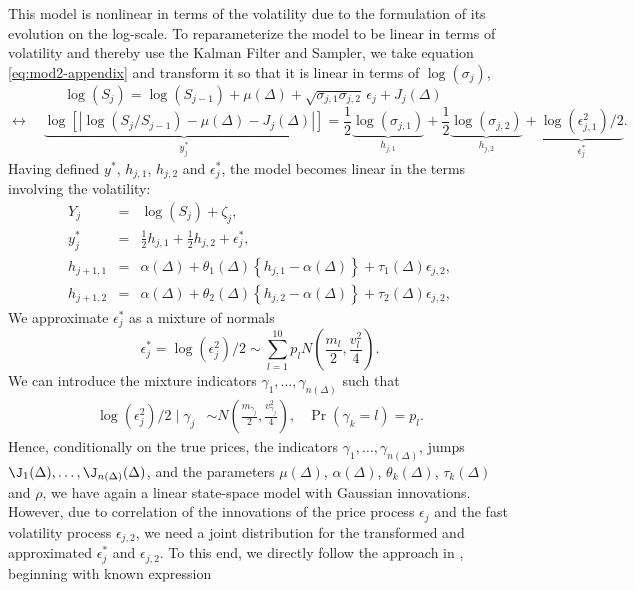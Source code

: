 \documentclass[10pt]{article}
\begin{document}
This model is nonlinear in terms of the volatility due to the formulation of its evolution on the log-scale. To reparameterize the model to be linear in terms of volatility and thereby use the Kalman Filter and Sampler, we take equation \eqref{eq:mod2-appendix} and transform it so that it is linear in terms of $\log(\sigma_j)$,
\[
  \log(S_{j}) = \log(S_{j-1}) + \mu(\Delta) + \sqrt{\sigma_{j,1}\sigma_{j,2}} \, \epsilon_{j} + J_j(\Delta) \quad \]
\[ \leftrightarrow \quad \underbrace{ \log\left[ \left| \log(S_{j}/S_{j-1}) - \mu(\Delta) - J_j(\Delta) \right| \right] }_{y_j^*} = \frac{1}{2}\underbrace{  \log(\sigma_{j,1}) }_{h_{j,1}} + \frac{1}{2}\underbrace{  \log(\sigma_{j,2}) }_{h_{j,2}} + \underbrace{ \log(  \epsilon_{j,1}^2  )/2 }_{\epsilon_{j}^{*}}.
\]
Having defined $y^*$, $h_{j,1}$, $h_{j,2}$ and $\epsilon_{j}^*$, the model becomes linear in the terms involving the volatility:
\begin{eqnarray}
	Y_j &=& \log(S_j) + \zeta_j  ,    \\
	y_j^* &=& \frac{1}{2}h_{j,1} + \frac{1}{2}h_{j,2} + \epsilon^*_{j}, \label{eq:yjstar} \\
  h_{j+1,1} &=& \alpha(\Delta) + \theta_1(\Delta) \left\{ h_{j,1}- \alpha(\Delta) \right\} + \tau_1(\Delta) \epsilon_{j,2}  \label{eq:hj1}, \\
  h_{j+1,2} &=& \alpha(\Delta) + \theta_2(\Delta) \left\{ h_{j,2}- \alpha(\Delta) \right\} + \tau_2(\Delta) \epsilon_{j,2}  \label{eq:hj2},
\end{eqnarray}
We approximate $\epsilon^*_{j}$ as a mixture of normals
\[
	\epsilon^*_{j} = \log( \epsilon_{j}^2 )/2 \sim \sum_{l=1}^{10} p_l N \left( \frac{m_l}{2}, \frac{v_l^2}{4} \right).
\]
We can introduce the mixture indicators $\gamma_1, \ldots, \gamma_{n(\Delta)}$ such that
\begin{align*}
\log( \epsilon^2_{j} )/2 \mid \gamma_j &\sim N \left( \frac{m_{\gamma_j}}{2}, \frac{v_{\gamma_j}^2}{4} \right)   ,   &   \Pr(\gamma_k = l) = p_l .
\end{align*}
Hence, conditionally on the true prices, the indicators $\gamma_{1}, \ldots, \gamma_{n(\Delta)}$, jumps $\J_{1}(\Delta), \ldots, \J_{n(\Delta)}(\Delta)$, and the parameters $\mu(\Delta)$, $\alpha(\Delta)$, $\theta_k(\Delta)$, $\tau_k(\Delta)$ and $\rho$, we have again a linear state-space model with Gaussian innovations. However, due to correlation of  the innovations of the price process $\epsilon_{j}$ and the fast volatility process $\epsilon_{j,2}$, we need a joint distribution for the transformed and approximated $\epsilon_{j}^*$ and $\epsilon_{j,2}$. To this end, we directly follow the approach in \cite{omori2007stochastic}, beginning with known expression
\end{document}
